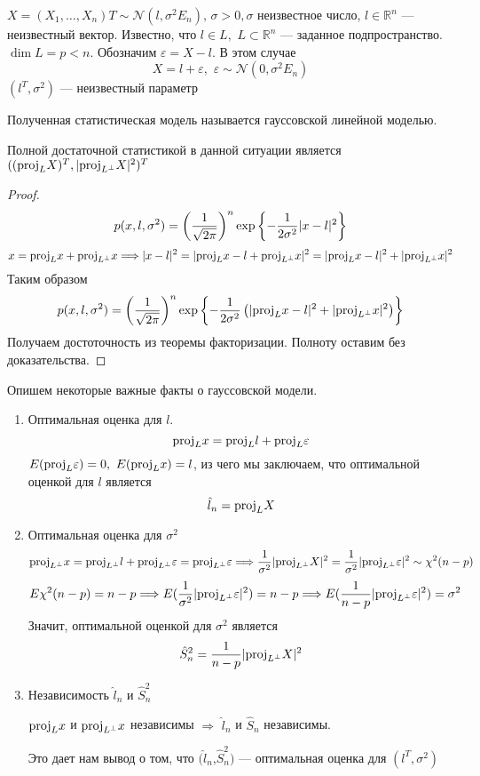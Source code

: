 \documentclass[12pt, russian]{article}
\begin{document}
$X = (X_1,\ldots,X_n)T \sim \mathcal{N}(l, \sigma^2E_n),\,\sigma>0, \sigma$ неизвестное число, $l\in\mathbb{R}^n$ --- неизвестный вектор. Известно, что $l\in L,\,\,L\subset \mathbb{R}^n$ --- заданное подпространство. $\dim L = p < n$.
Обозначим $\varepsilon = X - l$. В этом случае 
$$X = l + \varepsilon,\,\, \varepsilon\sim\mathcal{N}(0, \sigma^2E_n)$$
$(l^T, \sigma^2)$ --- неизвестный параметр

\begin{mydef}
Полученная статистическая модель называется гауссовской линейной моделью.
\end{mydef}

 Полной достаточной статистикой в данной ситуации является $((\text{proj}_{L}{X})^T, |\text{proj}_{L^\perp}{X}|^2)^T$
\begin{proof}
$$ p(x, l, \sigma^2) = \left(\frac{1}{\sqrt{2\pi}}\right)^n \exp{\left\{{-\frac{1}{2\sigma^2}|x - l|^2}\right\}}$$
$$ x = \text{proj}_{L}{x} + \text{proj}_{L^\perp}{x} \Longrightarrow |x - l|^2 = |\text{proj}_{L}{x} - l + \text{proj}_{L^\perp}{x}|^2 = |\text{proj}_{L}{x} - l|^2 + |\text{proj}_{L^\perp}{x}|^2 $$
Таким образом
$$ p(x, l, \sigma^2) = \left(\frac{1}{\sqrt{2\pi}}\right)^n \exp{\left\{{-\frac{1}{2\sigma^2}\left(|\text{proj}_{L}{x} - l|^2 + |\text{proj}_{L^\perp}{x}|^2\right)}\right\}}$$
Получаем достоточность из теоремы факторизации. Полноту оставим без доказательства.
\end{proof}

\noindent Опишем некоторые важные факты о гауссовской модели.
\begin{enumerate}
\item Оптимальная оценка для $l$.
$$ \text{proj}_{L}{x} = \text{proj}_{L}{l} + \text{proj}_{L}{\varepsilon} $$
$E(\text{proj}_{L}{\varepsilon}) = 0,\,\, E(\text{proj}_{L}{x}) = l$, из чего мы заключаем, что оптимальной оценкой для $l$ является $$\hat{l}_n = \text{proj}_{L}{X}$$

\item Оптимальная оценка для $\sigma^2$
$$ \text{proj}_{L^\perp}{x} = \text{proj}_{L^\perp}{l} + \text{proj}_{L^\perp}{\varepsilon} = \text{proj}_{L^\perp}{\varepsilon} \Longrightarrow \frac{1}{\sigma^2}|\text{proj}_{L^\perp}{X}|^2 = \frac{1}{\sigma^2}|\text{proj}_{L^\perp}{\varepsilon}|^2 \sim \chi^2(n-p)$$
$$ E\chi^2(n-p) = n-p \Longrightarrow E(\frac{1}{\sigma^2}|\text{proj}_{L^\perp}{\varepsilon}|^2) = n -p \Longrightarrow E(\frac{1}{n-p}|\text{proj}_{L^\perp}{\varepsilon}|^2) = \sigma^2$$
Значит, оптимальной оценкой для $\sigma^2$ является
$$ \hat{S}_n^2 = \frac{1}{n-p}|\text{proj}_{L^\perp}{X}|^2 $$

\item Независимость $\hat{l}_n$ и $\hat{S}_n^2$

$\text{proj}_{L}{x}$ и $\text{proj}_{L^\perp}{x}$ независимы $\Longrightarrow$ $\hat{l}_n$ и $\hat{S}_n$ независимы.

Это дает нам вывод о том, что $(\hat{l}_n$,$\hat{S}_n^2)$ --- оптимальная оценка для $(l^T, \sigma^2)$
\end{enumerate}
\end{document}
